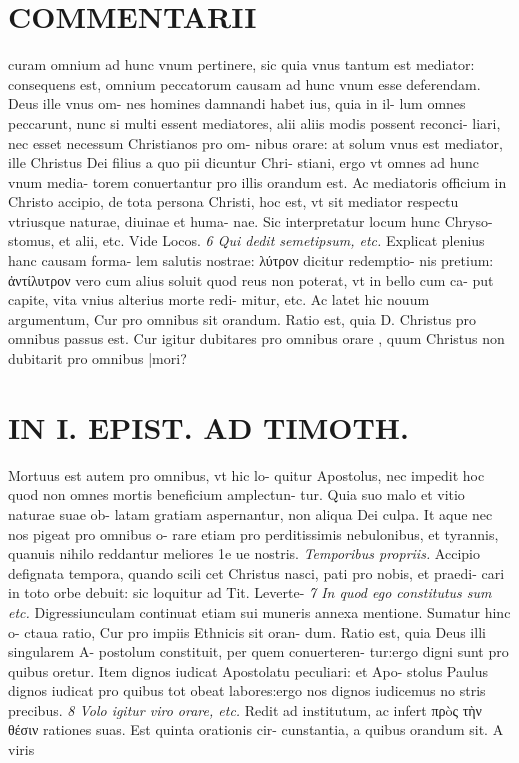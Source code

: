 \documentclass{article}
\begin{document}
\begin{pages}
\section*{COMMENTARII }\pstart curam omnium ad hunc vnum pertinere, sic quia vnus tantum est mediator: consequens est, omnium peccatorum causam ad hunc vnum esse deferendam. Deus ille vnus om- nes homines damnandi habet ius, quia in il- lum omnes peccarunt, nunc si multi essent mediatores, alii aliis modis possent reconci- liari, nec esset necessum Christianos pro om- nibus orare: at solum vnus est mediator, ille Christus Dei filius a quo pii dicuntur Chri- stiani, ergo vt omnes ad hunc vnum media- torem conuertantur pro illis orandum est. Ac mediatoris officium in Christo accipio, de tota persona Christi, hoc est, vt sit mediator respectu vtriusque naturae, diuinae et huma- nae. Sic interpretatur locum hunc Chryso- stomus, et alii, etc. Vide Locos.  \pend
\textit{6 Qui dedit semetipsum, etc. }\pstart Explicat plenius hanc causam forma- lem salutis nostrae: λύτρον dicitur redemptio- nis pretium: ἀντίλυτρον vero cum alius soluit quod reus non poterat, vt in bello cum ca- put capite, vita vnius alterius morte redi- mitur, etc.  \pend\pstart Ac latet hic nouum argumentum, Cur pro omnibus sit orandum. Ratio est, quia D. Christus pro omnibus passus est. Cur igitur dubitares pro omnibus orare , quum Christus non dubitarit pro omnibus |mori?  \pend
\section*{IN I. EPIST. AD TIMOTH. }
\marginpar{[ p.5 ]}\pstart Mortuus est autem pro omnibus, vt hic lo- quitur Apostolus, nec impedit hoc quod non omnes mortis beneficium amplectun- tur. Quia suo malo et vitio naturae suae ob- latam gratiam aspernantur, non aliqua Dei culpa. It aque nec nos pigeat pro omnibus o- rare etiam pro perditissimis nebulonibus, et tyrannis, quanuis nihilo reddantur meliores 1e ue nostris.  \pend
\textit{Temporibus propriis. }\pstart Accipio defignata tempora, quando scili cet Christus nasci, pati pro nobis, et praedi- cari in toto orbe debuit: sic loquitur ad Tit. Leverte-  \pend
\textit{7 In quod ego constitutus sum etc. }\pstart Digressiunculam continuat etiam sui muneris annexa mentione. Sumatur hinc o- ctaua ratio, Cur pro impiis Ethnicis sit oran- dum. Ratio est, quia Deus illi singularem A- postolum constituit, per quem conuerteren- tur:ergo digni sunt pro quibus oretur. Item dignos iudicat Apostolatu peculiari: et Apo- stolus Paulus dignos iudicat pro quibus tot obeat labores:ergo nos dignos iudicemus no stris precibus.  \pend
\textit{8 Volo igitur viro orare, etc. }\pstart Redit ad institutum, ac infert πρòς τὴν θέσιν rationes suas. Est quinta orationis cir- cunstantia, a quibus orandum sit. A viris  \pend
\marginpar{[ p.52 ]}

\end{pages}
\end{document}
